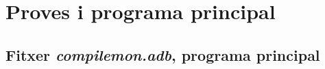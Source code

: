 \section{Proves i programa principal}

\subsection{Fitxer \emph{compilemon.adb}, programa principal}

\newpage
